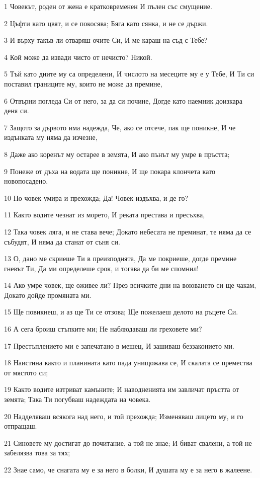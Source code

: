 \par 1 Човекът, роден от жена е кратковременен И пълен със смущение.
\par 2 Цъфти като цвят, и се покосява; Бяга като сянка, и не се държи.
\par 3 И върху такъв ли отваряш очите Си, И ме караш на съд с Тебе?
\par 4 Кой може да извади чисто от нечисто? Никой.
\par 5 Тъй като дните му са определени, И числото на месеците му е у Тебе, И Ти си поставил границите му, които не може да премине,
\par 6 Отвърни погледа Си от него, за да си почине, Догде като наемник доизкара деня си.
\par 7 Защото за дървото има надежда, Че, ако се отсече, пак ще поникне, И че издънката му няма да изчезне,
\par 8 Даже ако коренът му остарее в земята, И ако пънът му умре в пръстта;
\par 9 Понеже от дъха на водата ще поникне, И ще покара клончета като новопосадено.
\par 10 Но човек умира и прехожда; Да! Човек издъхва, и де го?
\par 11 Както водите чезнат из морето, И реката престава и пресъхва,
\par 12 Така човек ляга, и не става вече; Докато небесата не преминат, те няма да се събудят, И няма да станат от съня си.
\par 13 О, дано ме скриеше Ти в преизподнята, Да ме покриеше, догде премине гневът Ти, Да ми определеше срок, и тогава да би ме спомнил!
\par 14 Ако умре човек, ще оживее ли? През всичките дни на воюването си ще чакам, Докато дойде промяната ми.
\par 15 Ще повикнеш, и аз ще Ти се отзова; Ще пожелаеш делото на ръцете Си.
\par 16 А сега броиш стъпките ми; Не наблюдаваш ли греховете ми?
\par 17 Престъплението ми е запечатано в мешец, И зашиваш беззаконието ми.
\par 18 Наистина както и планината като пада унищожава се, И скалата се премества от мястото си;
\par 19 Както водите изтриват камъните; И наводненията им завличат пръстта от земята; Така Ти погубваш надеждата на човека.
\par 20 Надделяваш всякога над него, и той прехожда; Изменяваш лицето му, и го отпращаш.
\par 21 Синовете му достигат до почитание, а той не знае; И биват свалени, а той не забелязва това за тях;
\par 22 Знае само, че снагата му е за него в болки, И душата му е за него в жалеене.

